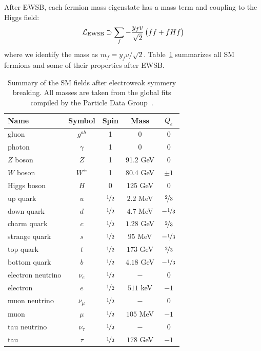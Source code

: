 After EWSB, each fermion mass eigenstate has a mass term and coupling to the Higgs field:
\begin{equation}
    \mathcal{L}_\mathrm{EWSB} \supset \sum_f -\frac{y_f v}{\sqrt{2}} \left( \bar ff + \bar fH f\right)
\end{equation}
where we identify the mass as $m_f = y_f v/\sqrt{2}$. 
Table~\ref{tab:theory:ewsb} summarizes all SM fermions and some of their properties after EWSB.

\begin{table}[]
\begin{center}
    \caption{Summary of the SM fields after electroweak symmery breaking.
             All masses are taken from the global fits compiled by the Particle Data Group~\cite{pdg}.}
    \label{tab:theory:ewsb}
    \begin{tabular}{l|c|c|c|c}
        Name & Symbol & Spin & Mass & $Q_e$  \\  \hline \hline
        gluon & $g^{ab}$ & 1 & 0 & 0 \\   
        photon & $\gamma $ & 1 & 0 & 0 \\   
        $Z$ boson & $Z$ & 1 & 91.2 GeV & 0 \\   
        $W$ boson & $W^{\pm}$ & 1 & 80.4 GeV & $\pm 1$ \\   \hline 
        Higgs boson & $H$ & 0 & 125 GeV & $0$ \\   \hline 
        up quark & $u$ & $\nicefrac{1}{2}$ & $2.2$ MeV & $\nicefrac{2}{3}$    \\   
        down quark & $d$  & $\nicefrac{1}{2}$ & $4.7$ MeV  & $-\nicefrac{1}{3}$  \\   
        charm quark & $c$  & $\nicefrac{1}{2}$ & $1.28$ GeV  & $\nicefrac{2}{3}$  \\   
        strange quark & $s$  & $\nicefrac{1}{2}$ & $95$ MeV  & $-\nicefrac{1}{3}$  \\   
        top quark & $t$  & $\nicefrac{1}{2}$ & $173$ GeV  & $\nicefrac{2}{3}$  \\  
        bottom quark & $b$  & $\nicefrac{1}{2}$ & $4.18$ GeV  & $-\nicefrac{1}{3}$  \\   \hline
        electron neutrino  & $\nu_e$  & $\nicefrac{1}{2}$ & $-$  & $0$  \\   
        electron  & $e$  & $\nicefrac{1}{2}$ & $511$ keV  & $-1$  \\   
        muon neutrino  & $\nu_\mu$  & $\nicefrac{1}{2}$ & $-$  & $0$  \\   
        muon  & $\mu$  & $\nicefrac{1}{2}$ & $105$ MeV  & $-1$  \\   
        tau neutrino  & $\nu_\tau$  & $\nicefrac{1}{2}$ & $-$  & $0$  \\ 
        tau  & $\tau$  & $\nicefrac{1}{2}$ & $178$ GeV  & $-1$  \\   
    \end{tabular}
\end{center}
\end{table}

